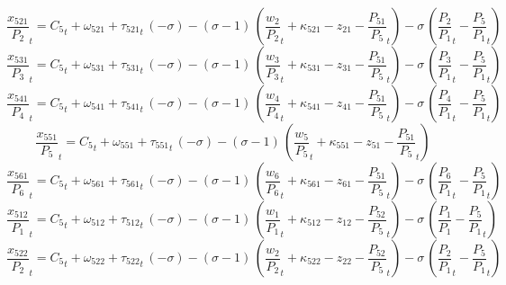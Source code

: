 \begin{dmath}
{{\frac{x_{521}}{P_{2}}}}_{t}={{C_{5}}}_{t}+{{\omega_{521}}}+{{\tau_{521}}}_{t}\, \left(-{{\sigma}}\right)-\left({{\sigma}}-1\right)\, \left({{\frac{w_{2}}{P_{2}}}}_{t}+{{\kappa_{521}}}-{{z_{21}}}-{{\frac{P_{51}}{P_{5}}}}_{t}\right)-{{\sigma}}\, \left({{\frac{P_{2}}{P_{1}}}}_{t}-{{\frac{P_{5}}{P_{1}}}}_{t}\right)
\end{dmath}
\begin{dmath}
{{\frac{x_{531}}{P_{3}}}}_{t}={{C_{5}}}_{t}+{{\omega_{531}}}+{{\tau_{531}}}_{t}\, \left(-{{\sigma}}\right)-\left({{\sigma}}-1\right)\, \left({{\frac{w_{3}}{P_{3}}}}_{t}+{{\kappa_{531}}}-{{z_{31}}}-{{\frac{P_{51}}{P_{5}}}}_{t}\right)-{{\sigma}}\, \left({{\frac{P_{3}}{P_{1}}}}_{t}-{{\frac{P_{5}}{P_{1}}}}_{t}\right)
\end{dmath}
\begin{dmath}
{{\frac{x_{541}}{P_{4}}}}_{t}={{C_{5}}}_{t}+{{\omega_{541}}}+{{\tau_{541}}}_{t}\, \left(-{{\sigma}}\right)-\left({{\sigma}}-1\right)\, \left({{\frac{w_{4}}{P_{4}}}}_{t}+{{\kappa_{541}}}-{{z_{41}}}-{{\frac{P_{51}}{P_{5}}}}_{t}\right)-{{\sigma}}\, \left({{\frac{P_{4}}{P_{1}}}}_{t}-{{\frac{P_{5}}{P_{1}}}}_{t}\right)
\end{dmath}
\begin{dmath}
{{\frac{x_{551}}{P_{5}}}}_{t}={{C_{5}}}_{t}+{{\omega_{551}}}+{{\tau_{551}}}_{t}\, \left(-{{\sigma}}\right)-\left({{\sigma}}-1\right)\, \left({{\frac{w_{5}}{P_{5}}}}_{t}+{{\kappa_{551}}}-{{z_{51}}}-{{\frac{P_{51}}{P_{5}}}}_{t}\right)
\end{dmath}
\begin{dmath}
{{\frac{x_{561}}{P_{6}}}}_{t}={{C_{5}}}_{t}+{{\omega_{561}}}+{{\tau_{561}}}_{t}\, \left(-{{\sigma}}\right)-\left({{\sigma}}-1\right)\, \left({{\frac{w_{6}}{P_{6}}}}_{t}+{{\kappa_{561}}}-{{z_{61}}}-{{\frac{P_{51}}{P_{5}}}}_{t}\right)-{{\sigma}}\, \left({{\frac{P_{6}}{P_{1}}}}_{t}-{{\frac{P_{5}}{P_{1}}}}_{t}\right)
\end{dmath}
\begin{dmath}
{{\frac{x_{512}}{P_{1}}}}_{t}={{C_{5}}}_{t}+{{\omega_{512}}}+{{\tau_{512}}}_{t}\, \left(-{{\sigma}}\right)-\left({{\sigma}}-1\right)\, \left({{\frac{w_{1}}{P_{1}}}}_{t}+{{\kappa_{512}}}-{{z_{12}}}-{{\frac{P_{52}}{P_{5}}}}_{t}\right)-{{\sigma}}\, \left({{\frac{P_{1}}{P_{1}}}}-{{\frac{P_{5}}{P_{1}}}}_{t}\right)
\end{dmath}
\begin{dmath}
{{\frac{x_{522}}{P_{2}}}}_{t}={{C_{5}}}_{t}+{{\omega_{522}}}+{{\tau_{522}}}_{t}\, \left(-{{\sigma}}\right)-\left({{\sigma}}-1\right)\, \left({{\frac{w_{2}}{P_{2}}}}_{t}+{{\kappa_{522}}}-{{z_{22}}}-{{\frac{P_{52}}{P_{5}}}}_{t}\right)-{{\sigma}}\, \left({{\frac{P_{2}}{P_{1}}}}_{t}-{{\frac{P_{5}}{P_{1}}}}_{t}\right)
\end{dmath}
